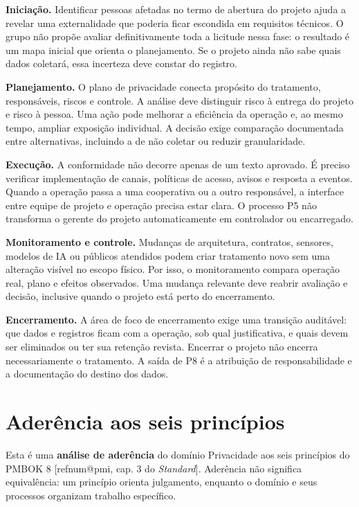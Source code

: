 \documentclass[11pt,a4paper]{article}
\makeatletter
\newcommand{\refnum}[1]{\csname refnum@#1\endcsname}
\makeatother
\begin{document}
\textbf{Iniciação.} Identificar pessoas afetadas no termo de abertura do projeto ajuda a revelar uma externalidade que poderia ficar escondida em requisitos técnicos. O grupo não propõe avaliar definitivamente toda a licitude nessa fase: o resultado é um mapa inicial que orienta o planejamento. Se o projeto ainda não sabe quais dados coletará, essa incerteza deve constar do registro.

\textbf{Planejamento.} O plano de privacidade conecta propósito do tratamento, responsáveis, riscos e controle. A análise deve distinguir risco à entrega do projeto e risco à pessoa. Uma ação pode melhorar a eficiência da operação e, ao mesmo tempo, ampliar exposição individual. A decisão exige comparação documentada entre alternativas, incluindo a de não coletar ou reduzir granularidade.

\textbf{Execução.} A conformidade não decorre apenas de um texto aprovado. É preciso verificar implementação de canais, políticas de acesso, avisos e resposta a eventos. Quando a operação passa a uma cooperativa ou a outro responsável, a interface entre equipe de projeto e operação precisa estar clara. O processo P5 não transforma o gerente do projeto automaticamente em controlador ou encarregado.

\textbf{Monitoramento e controle.} Mudanças de arquitetura, contratos, sensores, modelos de IA ou públicos atendidos podem criar tratamento novo sem uma alteração visível no escopo físico. Por isso, o monitoramento compara operação real, plano e efeitos observados. Uma mudança relevante deve reabrir avaliação e decisão, inclusive quando o projeto está perto do encerramento.

\textbf{Encerramento.} A área de foco de encerramento exige uma transição auditável: que dados e registros ficam com a operação, sob qual justificativa, e quais devem ser eliminados ou ter sua retenção revista. Encerrar o projeto não encerra necessariamente o tratamento. A saída de P8 é a atribuição de responsabilidade e a documentação do destino dos dados.

\section{Aderência aos seis princípios}

Esta é uma \textbf{análise de aderência} do domínio Privacidade aos seis princípios do PMBOK 8 [\refnum{pmi}, cap. 3 do \textit{Standard}]. Aderência não significa equivalência: um princípio orienta julgamento, enquanto o domínio e seus processos organizam trabalho específico.
\end{document}
